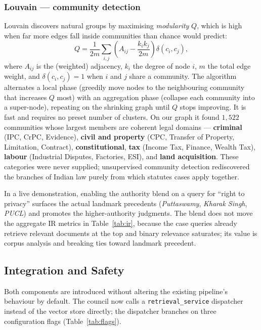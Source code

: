 \subsubsection{Louvain --- community detection}
Louvain discovers natural groups by maximising \emph{modularity} $Q$, which is high when far
more edges fall inside communities than chance would predict:
\begin{equation}
Q = \frac{1}{2m}\sum_{i,j}\!\left(A_{ij} - \frac{k_i k_j}{2m}\right)\delta(c_i, c_j),
\end{equation}
where $A_{ij}$ is the (weighted) adjacency, $k_i$ the degree of node $i$, $m$ the total edge
weight, and $\delta(c_i,c_j) = 1$ when $i$ and $j$ share a community. The algorithm alternates a
local phase (greedily move nodes to the neighbouring community that increases $Q$ most) with an
aggregation phase (collapse each community into a super-node), repeating on the shrinking graph
until $Q$ stops improving. It is fast and requires no preset number of clusters. On our graph it
found $1{,}522$ communities whose largest members are coherent legal domains --- \textbf{criminal}
(IPC, CrPC, Evidence), \textbf{civil and property} (CPC, Transfer of Property, Limitation,
Contract), \textbf{constitutional}, \textbf{tax} (Income Tax, Finance, Wealth Tax),
\textbf{labour} (Industrial Disputes, Factories, ESI), and \textbf{land acquisition}. These
categories were never supplied; unsupervised community detection rediscovered the branches of
Indian law purely from which statutes cases apply together.

In a live demonstration, enabling the authority blend on a query for ``right to privacy''
surfaces the actual landmark precedents (\emph{Puttaswamy}, \emph{Kharak Singh}, \emph{PUCL})
and promotes the higher-authority judgments. The blend does not move the aggregate IR metrics in
Table~\ref{tab:ir}, because the case queries already retrieve relevant documents at the top and
binary relevance saturates; its value is corpus analysis and breaking ties toward landmark
precedent.

\subsection{Integration and Safety}
\label{sec:integration}

Both components are introduced without altering the existing pipeline's behaviour by default.
The council now calls a \texttt{retrieval\_service} dispatcher instead of the vector store
directly; the dispatcher branches on three configuration flags (Table~\ref{tab:flags}).


